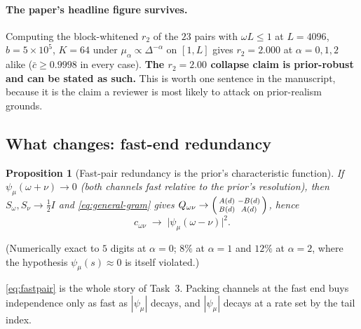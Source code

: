 \documentclass[11pt]{article}
\newtheorem{proposition}[theorem]{Proposition}
\theoremstyle{definition}
\begin{document}
\paragraph{The paper's headline figure survives.} Computing the block-whitened $r_2$ of the $23$
pairs with $\omega L\le1$ at $L{=}4096$, $b{=}5{\times}10^5$, $K{=}64$ under
$\mu_\alpha\propto\Delta^{-\alpha}$ on $[1,L]$ gives $r_2=2.000$ at $\alpha=0,1,2$ alike
($\bar c\ge0.9998$ in every case). \textbf{The $r_2=2.00$ collapse claim is prior-robust and can be
stated as such.} This is worth one sentence in the manuscript, because it is the claim a reviewer is
most likely to attack on prior-realism grounds.

\subsection{What changes: fast-end redundancy}

\begin{proposition}[Fast-pair redundancy is the prior's characteristic function]\label{prop:fastpair}
If $\psi_\mu(\omega+\nu)\to0$ (both channels fast relative to the prior's resolution), then
$S_\omega,S_\nu\to\tfrac12I$ and \eqref{eq:general-gram} gives
$Q_{\omega\nu}\to\begin{psmallmatrix}A(d)&-B(d)\\B(d)&A(d)\end{psmallmatrix}$, hence
\begin{equation}
c_{\omega\nu}\;\longrightarrow\;\bigl|\psi_\mu(\omega-\nu)\bigr|^2 .
\label{eq:fastpair}
\end{equation}
\end{proposition}
(Numerically exact to $5$ digits at $\alpha=0$; $8\%$ at $\alpha=1$ and $12\%$ at $\alpha=2$, where
the hypothesis $\psi_\mu(s)\approx0$ is itself violated.)

\eqref{eq:fastpair} is the whole story of Task~3. Packing channels at the fast end buys independence
only as fast as $|\psi_\mu|$ decays, and $|\psi_\mu|$ decays at a rate set by the tail index.
\end{document}
